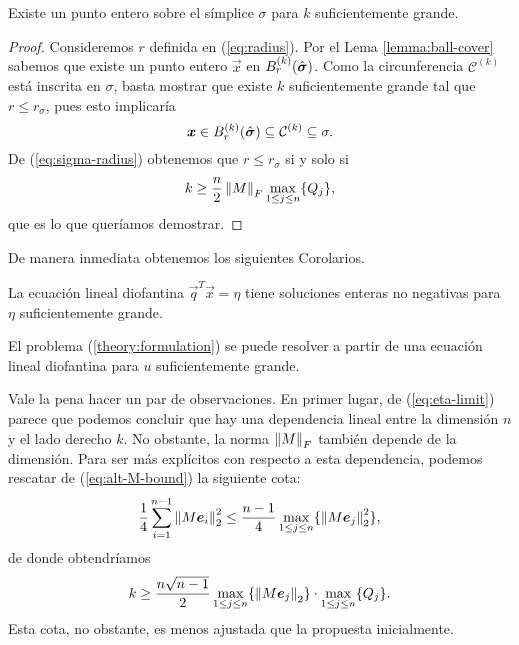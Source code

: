 \begin{theorem}
	Existe un punto entero sobre el símplice $\sigma$ para $k$ suficientemente grande.
\end{theorem}
\begin{proof}
	Consideremos $r$ definida en (\ref{eq:radius}). Por el Lema \ref{lemma:ball-cover} sabemos que
	existe un punto entero $\vec{x}$ en $B_r^{(k)}(\hat{\boldsymbol{ \sigma }})$. Como la circunferencia
	$\mathcal{C}^{(k)}$ está inscrita en $\sigma$, basta mostrar que existe $k$
	suficientemente grande tal que $r \leq r_\sigma$, pues esto implicaría
	\begin{equation*}
		\boldsymbol{x} \in B_r^{(k)}(\hat{\boldsymbol{ \sigma }}) \subseteq \mathcal{C}^{(k)} \subseteq \sigma.
	\end{equation*}
	De (\ref{eq:sigma-radius}) obtenemos que $r \leq r_\sigma$ si y solo si
	\begin{equation}
		\label{eq:eta-limit}
		k \geq \frac{n}{2}\left\lVert M \right\rVert_F\max_{1 \leq j \leq n} \lbrace Q_j \rbrace,
	\end{equation}
	que es lo que queríamos demostrar.
\end{proof}
De manera inmediata obtenemos los siguientes Corolarios.
\begin{corollary}
	La ecuación lineal diofantina $\vec{q}^T\vec{x} = \eta$ tiene soluciones enteras no negativas para
	$\eta$ suficientemente grande.
\end{corollary}
\begin{corollary}
	El problema (\ref{theory:formulation}) se puede resolver a partir de una ecuación lineal
	diofantina para $u$ suficientemente grande.
\end{corollary}

Vale la pena hacer un par de observaciones. En primer lugar, de (\ref{eq:eta-limit}) parece que
podemos concluir que hay una dependencia lineal entre la dimensión $n$ y el lado derecho $k$. No
obstante, la norma $\left\lVert M \right\rVert_F$ también depende de la dimensión. Para ser más explícitos con
respecto a esta dependencia, podemos rescatar de (\ref{eq:alt-M-bound}) la siguiente cota:
\begin{equation*}
	\frac{1}{4}\sum_{i=1}^{n-1}\left\lVert M\boldsymbol{e}_i \right\rVert_2^2
	\leq
	\frac{n-1}{4}\max_{1 \leq j \leq n} \lbrace \left\lVert M\boldsymbol{e}_j \right\rVert_2^2 \rbrace,
\end{equation*}
de donde obtendríamos
\begin{equation*}
	k \geq \frac{n\sqrt{n-1}}{2} \max_{1 \leq j \leq n} \lbrace \left\lVert M\boldsymbol{e}_j \right\rVert_2 \rbrace \cdot
	\max_{1 \leq j \leq n} \lbrace Q_j \rbrace.
\end{equation*}
Esta cota, no obstante, es menos ajustada que la propuesta inicialmente.

